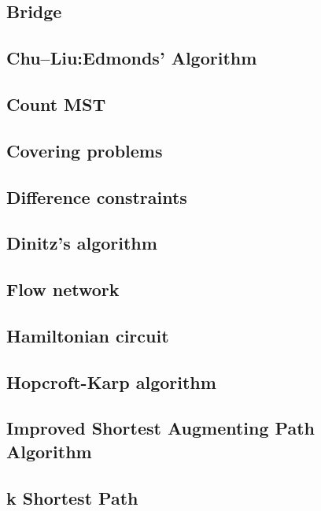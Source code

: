 \documentclass[a4paper,5pt,twocolumn,titlepage]{article}
\begin{document}
\subsection{Bridge}

\subsection{Chu–Liu:Edmonds' Algorithm}

\subsection{Count MST}

\subsection{Covering problems}

\subsection{Difference constraints}

\subsection{Dinitz's algorithm}

\subsection{Flow network}

\subsection{Hamiltonian circuit}

\subsection{Hopcroft-Karp algorithm}

\subsection{Improved Shortest Augmenting Path Algorithm}

\subsection{k Shortest Path}

\end{document}
